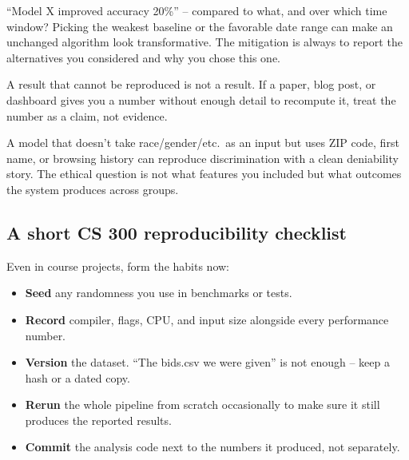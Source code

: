 \documentclass[11pt]{article}
\begin{document}
\begin{warnbox}
``Model X improved accuracy 20\%'' -- compared to what, and over
which time window? Picking the weakest baseline or the favorable
date range can make an unchanged algorithm look transformative. The
mitigation is always to report the alternatives you considered and
why you chose this one.
\end{warnbox}

\begin{warnbox}
A result that cannot be reproduced is not a result. If a paper,
blog post, or dashboard gives you a number without enough detail to
recompute it, treat the number as a claim, not evidence.
\end{warnbox}

\begin{warnbox}
A model that doesn't take race/gender/etc.\ as an input but uses ZIP
code, first name, or browsing history can reproduce discrimination
with a clean deniability story. The ethical question is not what
features you included but what outcomes the system produces across
groups.
\end{warnbox}

\subsection{A short CS 300 reproducibility checklist}

Even in course projects, form the habits now:

\begin{itemize}[leftmargin=*,noitemsep]
    \item \textbf{Seed} any randomness you use in benchmarks or tests.
    \item \textbf{Record} compiler, flags, CPU, and input size alongside
          every performance number.
    \item \textbf{Version} the dataset. ``The bids.csv we were given''
          is not enough -- keep a hash or a dated copy.
    \item \textbf{Rerun} the whole pipeline from scratch occasionally
          to make sure it still produces the reported results.
    \item \textbf{Commit} the analysis code next to the numbers it
          produced, not separately.
\end{itemize}
\end{document}
